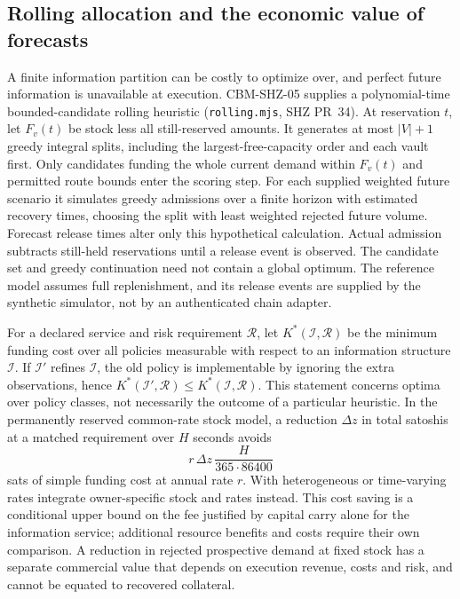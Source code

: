 \subsection{Rolling allocation and the economic value of forecasts}
\label{sec:rent-rolling}

A finite information partition can be costly to optimize over, and perfect future information is unavailable at execution. CBM-SHZ-05 supplies a polynomial-time bounded-candidate rolling heuristic (\texttt{rolling.mjs}, SHZ PR~34). At reservation $t$, let $F_v(t)$ be stock less all still-reserved amounts. It generates at most $|V|+1$ greedy integral splits, including the largest-free-capacity order and each vault first. Only candidates funding the whole current demand within $F_v(t)$ and permitted route bounds enter the scoring step. For each supplied weighted future scenario it simulates greedy admissions over a finite horizon with estimated recovery times, choosing the split with least weighted rejected future volume. Forecast release times alter only this hypothetical calculation. Actual admission subtracts still-held reservations until a release event is observed. The candidate set and greedy continuation need not contain a global optimum. The reference model assumes full replenishment, and its release events are supplied by the synthetic simulator, not by an authenticated chain adapter.

For a declared service and risk requirement $\mathcal R$, let $K^*(\mathcal I,\mathcal R)$ be the minimum funding cost over all policies measurable with respect to an information structure $\mathcal I$. If $\mathcal I'$ refines $\mathcal I$, the old policy is implementable by ignoring the extra observations, hence $K^*(\mathcal I',\mathcal R)\le K^*(\mathcal I,\mathcal R)$. This statement concerns optima over policy classes, not necessarily the outcome of a particular heuristic. In the permanently reserved common-rate stock model, a reduction $\Delta z$ in total satoshis at a matched requirement over $H$ seconds avoids
\[
 r\,\Delta z\,\frac{H}{365\cdot86400}
\]
sats of simple funding cost at annual rate $r$. With heterogeneous or time-varying rates integrate owner-specific stock and rates instead. This cost saving is a conditional upper bound on the fee justified by capital carry alone for the information service; additional resource benefits and costs require their own comparison. A reduction in rejected prospective demand at fixed stock has a separate commercial value that depends on execution revenue, costs and risk, and cannot be equated to recovered collateral.

